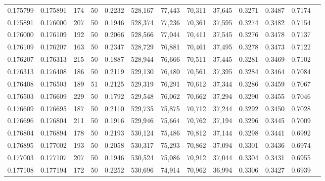 \begin{tabular}{rrrrrrrrrrrrr}
0.175799 & 0.175891 &   174 &  50 &                                     0.2232 & 528,167 &  77,443 &  70,311 &  37,645 & 0.3271 & 0.3487 & 0.7174 \\
0.175891 & 0.176000 &   207 &  50 &                                     0.1946 & 528,374 &  77,236 &  70,361 &  37,595 & 0.3274 & 0.3482 & 0.7154 \\
0.176000 & 0.176109 &   192 &  50 &                                     0.2066 & 528,566 &  77,044 &  70,411 &  37,545 & 0.3276 & 0.3478 & 0.7137 \\
0.176109 & 0.176207 &   163 &  50 &                                     0.2347 & 528,729 &  76,881 &  70,461 &  37,495 & 0.3278 & 0.3473 & 0.7122 \\
0.176207 & 0.176313 &   215 &  50 &                                     0.1887 & 528,944 &  76,666 &  70,511 &  37,445 & 0.3281 & 0.3469 & 0.7102 \\
0.176313 & 0.176408 &   186 &  50 &                                     0.2119 & 529,130 &  76,480 &  70,561 &  37,395 & 0.3284 & 0.3464 & 0.7084 \\
0.176408 & 0.176503 &   189 &  51 &                                     0.2125 & 529,319 &  76,291 &  70,612 &  37,344 & 0.3286 & 0.3459 & 0.7067 \\
0.176503 & 0.176609 &   229 &  50 &                                     0.1792 & 529,548 &  76,062 &  70,662 &  37,294 & 0.3290 & 0.3455 & 0.7046 \\
0.176609 & 0.176695 &   187 &  50 &                                     0.2110 & 529,735 &  75,875 &  70,712 &  37,244 & 0.3292 & 0.3450 & 0.7028 \\
0.176696 & 0.176804 &   211 &  50 &                                     0.1916 & 529,946 &  75,664 &  70,762 &  37,194 & 0.3296 & 0.3445 & 0.7009 \\
0.176804 & 0.176894 &   178 &  50 &                                     0.2193 & 530,124 &  75,486 &  70,812 &  37,144 & 0.3298 & 0.3441 & 0.6992 \\
0.176895 & 0.177002 &   193 &  50 &                                     0.2058 & 530,317 &  75,293 &  70,862 &  37,094 & 0.3301 & 0.3436 & 0.6974 \\
0.177003 & 0.177107 &   207 &  50 &                                     0.1946 & 530,524 &  75,086 &  70,912 &  37,044 & 0.3304 & 0.3431 & 0.6955 \\
0.177108 & 0.177194 &   172 &  50 &                                     0.2252 & 530,696 &  74,914 &  70,962 &  36,994 & 0.3306 & 0.3427 & 0.6939 \\

\end{tabular}
